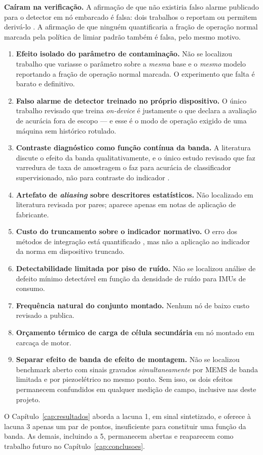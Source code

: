 \textbf{Caíram na verificação.} A afirmação de que não existiria falso alarme publicado
para o detector em nó embarcado é falsa: dois trabalhos o reportam ou permitem derivá-lo
\cite{chevtchenko2023,kolok2025}. A afirmação de que ninguém quantificaria a fração de
operação normal marcada pela política de limiar padrão também é falsa, pelo mesmo motivo.

\begin{enumerate}
  \item \textbf{Efeito isolado do parâmetro de contaminação.} Não se localizou trabalho que
        variasse o parâmetro sobre a \emph{mesma} base e o \emph{mesmo} modelo reportando a
        fração de operação normal marcada. O experimento que falta é barato e definitivo.
  \item \textbf{Falso alarme de detector treinado no próprio dispositivo.} O único trabalho
        revisado que treina \emph{on-device} é justamente o que declara a avaliação de
        acurácia fora de escopo \cite{antonini2023} --- e esse é o modo de operação exigido
        de uma máquina sem histórico rotulado.
  \item \textbf{Contraste diagnóstico como função contínua da banda.} A literatura discute
        o efeito da banda qualitativamente, e o único estudo revisado que faz varredura de
        taxa de amostragem o faz para acurácia de classificador supervisionado, não para
        contraste do indicador \cite{elbouharrouti2024}.
  \item \textbf{Artefato de \emph{aliasing} sobre descritores estatísticos.} Não localizado
        em literatura revisada por pares; aparece apenas em notas de aplicação de
        fabricante.
  \item \textbf{Custo do truncamento sobre o indicador normativo.} O erro dos métodos de
        integração está quantificado \cite{brandt2014}, mas não a aplicação ao indicador da
        norma em dispositivo truncado.
  \item \textbf{Detectabilidade limitada por piso de ruído.} Não se localizou análise de
        defeito mínimo detectável em função da densidade de ruído para IMUs de consumo.
  \item \textbf{Frequência natural do conjunto montado.} Nenhum nó de baixo custo revisado
        a publica.
  \item \textbf{Orçamento térmico de carga de célula secundária} em nó montado em carcaça
        de motor.
  \item \textbf{Separar efeito de banda de efeito de montagem.} Não se localizou benchmark
        aberto com sinais gravados \emph{simultaneamente} por MEMS de banda limitada e por
        piezoelétrico no mesmo ponto. Sem isso, os dois efeitos permanecem confundidos em
        qualquer medição de campo, inclusive nas deste projeto.
\end{enumerate}

O Capítulo~\ref{cap:resultados} aborda a lacuna 1, em sinal sintetizado, e oferece à
lacuna 3 apenas um par de pontos, insuficiente para constituir uma função da banda. As
demais, incluindo a 5, permanecem abertas e reaparecem como trabalho futuro no
Capítulo~\ref{cap:conclusoes}.
